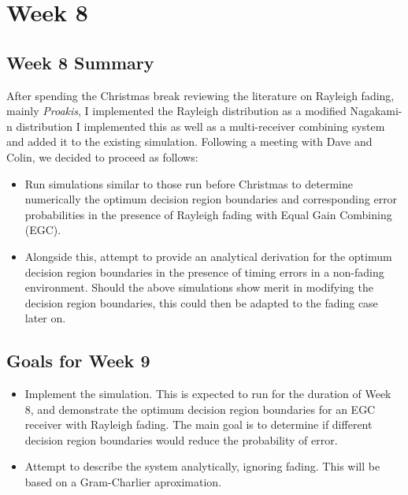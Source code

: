 \section{Week 8}

\subsection{Week 8 Summary}

After spending the Christmas break reviewing the literature on Rayleigh
fading, mainly \emph{Proakis}, I implemented the Rayleigh distribution
as a modified Nagakami-n distribution
I implemented this as well as a multi-receiver combining system and
added it to the existing simulation. Following a meeting with Dave and
Colin, we decided to proceed as follows:

\begin{itemize}
\itemsep1pt\parskip0pt
\item
  Run simulations similar to those run before Christmas to determine
  numerically the optimum decision region boundaries and corresponding
  error probabilities in the presence of Rayleigh fading with Equal Gain
  Combining (EGC).
\item
  Alongside this, attempt to provide an analytical derivation for the
  optimum decision region boundaries in the presence of timing errors in
  a non-fading environment. Should the above simulations show merit in
  modifying the decision region boundaries, this could then be adapted
  to the fading case later on.
\end{itemize}

\subsection{Goals for Week 9}

\begin{itemize}
\itemsep1pt\parskip0pt
\item
  Implement the simulation. This is expected to run for the duration of
  Week 8, and demonstrate the optimum decision region boundaries for an
  EGC receiver with Rayleigh fading. The main goal is to determine if
  different decision region boundaries would reduce the probability of
  error.
\item
  Attempt to describe the system analytically, ignoring fading. This
  will be based on a Gram-Charlier aproximation.
\end{itemize}

